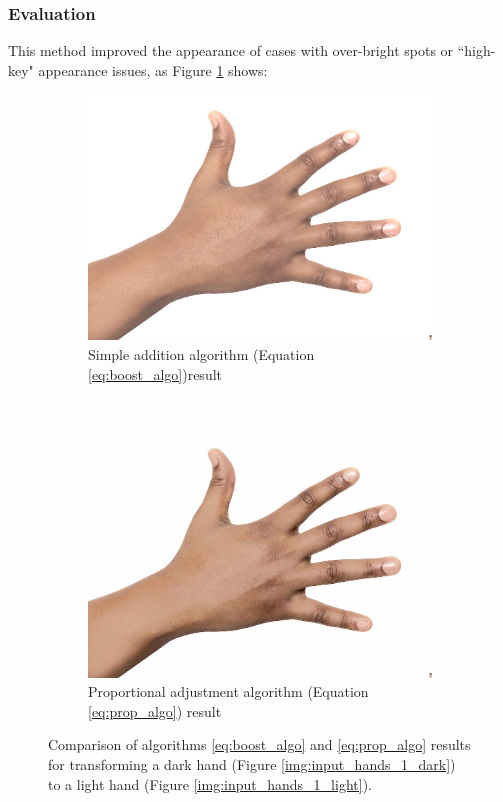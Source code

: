 \subsubsection*{Evaluation} \label{sec:algo_prop_eval}
This method improved the appearance of cases with over-bright spots or ``high-key" appearance issues, as Figure \ref{img:compare_bright_spot} shows:
\begin{figure}[H]
    \centering
    \begin{subfigure}[b]{0.40\textwidth}
        \includegraphics[width=\textwidth]{../rc_test/outputs/20170516_boost_test/hand_dark_to_hand_light.jpg}
        \caption{Simple addition algorithm (Equation \ref{eq:boost_algo})result}
    \end{subfigure}
    ~
    \begin{subfigure}[b]{0.40\textwidth}
        \includegraphics[width=\textwidth]{../rc_test/outputs/20170516_proportional_test/hand_dark_to_hand_light.jpg}
        \caption{Proportional adjustment algorithm (Equation \ref{eq:prop_algo}) result}
    \end{subfigure}
    \caption{Comparison of algorithms \ref{eq:boost_algo} and \ref{eq:prop_algo} results for transforming a dark hand (Figure \ref{img:input_hands_1_dark}) to a light hand (Figure \ref{img:input_hands_1_light}).\label{img:compare_bright_spot}}
\end{figure}

